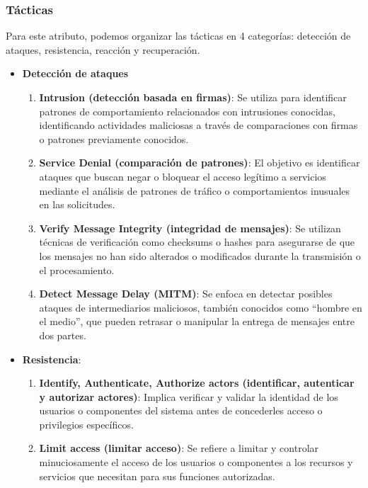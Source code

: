 \documentclass{article}
\begin{document}
		\subsubsection{Tácticas}
		Para este atributo, podemos organizar las tácticas en 4 categorías: detección de ataques, resistencia, reacción y recuperación.
		\begin{itemize}		
			\item \textbf{Detección de ataques}
			\begin{enumerate}
				\item \textbf{Intrusion (detección basada en firmas)}: Se utiliza para identificar patrones de comportamiento relacionados con intrusiones conocidas, identificando actividades maliciosas a través de comparaciones con firmas o patrones previamente conocidos.
				
				\item \textbf{Service Denial (comparación de patrones)}: El objetivo es identificar ataques que buscan negar o bloquear el acceso legítimo a servicios mediante el análisis de patrones de tráfico o comportamientos inusuales en las solicitudes.
				
				\item \textbf{Verify Message Integrity (integridad de mensajes)}: Se utilizan técnicas de verificación como checksums o hashes para asegurarse de que los mensajes no han sido alterados o modificados durante la transmisión o el procesamiento.
				
				\item \textbf{Detect Message Delay (MITM)}: Se enfoca en detectar posibles ataques de intermediarios maliciosos, también conocidos como ``hombre en el medio'', que pueden retrasar o manipular la entrega de mensajes entre dos partes.
			\end{enumerate}
			
			\item \textbf{Resistencia}:
			\begin{enumerate}
				\item \textbf{Identify, Authenticate, Authorize actors (identificar, autenticar y autorizar actores)}: Implica verificar y validar la identidad de los usuarios o componentes del sistema antes de concederles acceso o privilegios específicos.
				
				\item \textbf{Limit access (limitar acceso)}: Se refiere a limitar y controlar minuciosamente el acceso de los usuarios o componentes a los recursos y servicios que necesitan para sus funciones autorizadas.
				

\end{enumerate}
\end{itemize}
\end{document}
